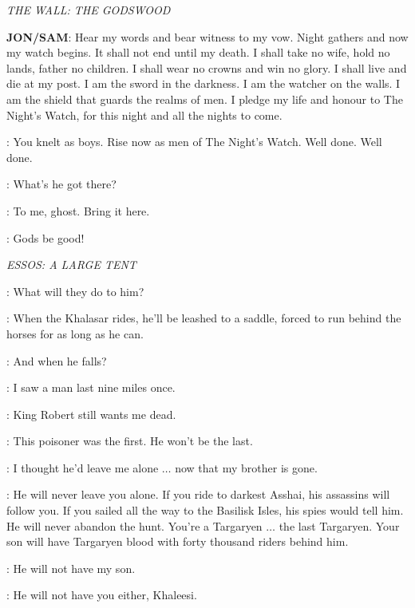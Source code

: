 \textit{THE WALL: THE GODSWOOD} 


\textbf{JON/SAM}: Hear my words and bear witness to my vow. Night gathers and now my watch begins. It shall not end until my death. I shall take no wife, hold no lands, father no children. I shall wear no crowns and win no glory. I shall live and die at my post. I am the sword in the darkness. I am the watcher on the walls. I am the shield that guards the realms of men. I pledge my life and honour to The Night's Watch, for this night and all the nights to come. 

\WATCHMANc: You knelt as boys. Rise now as men of The Night's Watch. Well done. Well done. 


\SAM: What's he got there? 

\JON: To me, ghost. Bring it here. 


\SAM: Gods be good! 


\scene

\textit{ESSOS: A LARGE TENT} 


\DAENERYS: What will they do to him? 

\JORAH: When the Khalasar rides, he'll be leashed to a saddle, forced to run behind the horses for as long as he can. 

\DAENERYS: And when he falls? 

\JORAH: I saw a man last nine miles once. 

\DAENERYS: King Robert still wants me dead. 

\JORAH: This poisoner was the first. He won't be the last. 

\DAENERYS: I thought he'd leave me alone $\ldots$ now that my brother is gone. 

\JORAH: He will never leave you alone. If you ride to darkest Asshai, his assassins will follow you. If you sailed all the way to the Basilisk Isles, his spies would tell him. He will never abandon the hunt. You're a Targaryen $\ldots$ the last Targaryen. Your son will have Targaryen blood with forty thousand riders behind him. 

\DAENERYS: He will not have my son. 

\JORAH: He will not have you either, Khaleesi. 

